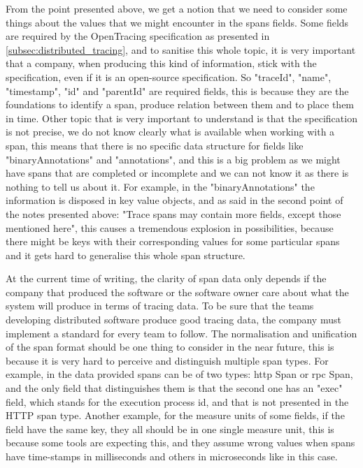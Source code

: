 From the point presented above, we get a notion that we need to consider some things about the values that we might encounter in the spans fields. Some fields are required by the OpenTracing specification as presented in \ref{subsec:distributed_tracing}, and to sanitise this whole topic, it is very important that a company, when producing this kind of information, stick with the specification, even if it is an open-source specification. So "traceId", "name", "timestamp", "id" and "parentId" are required fields, this is because they are the foundations to identify a span, produce relation between them and to place them in time. Other topic that is very important to understand is that the specification is not precise, we do not know clearly what is available when working with a span, this means that there is no specific data structure for fields like "binaryAnnotations" and "annotations", and this is a big problem as we might have spans that are completed or incomplete and we can not know it as there is nothing to tell us about it. For example, in the "binaryAnnotations" the information is disposed in key value objects, and as said in the second point of the notes presented above: "Trace spans may contain more fields, except those mentioned here", this causes a tremendous explosion in possibilities, because there might be keys with their corresponding values for some particular spans and it gets hard to generalise this whole span structure.

At the current time of writing, the clarity of span data only depends if the company that produced the software or the software owner care about what the system will produce in terms of tracing data. To be sure that the teams developing distributed software produce good tracing data, the company must implement a standard for every team to follow. The normalisation and unification of the span format should be one thing to consider in the near future, this is because it is very hard to perceive and distinguish multiple span types. For example, in the data provided spans can be of two types: \gls{http} Span or \gls{rpc} Span, and the only field that distinguishes them is that the second one has an "exec" field, which stands for the execution process id, and that is not presented in the HTTP span type. Another example, for the measure units of some fields, if the field have the same key, they all should be in one single measure unit, this is because some tools are expecting this, and they assume wrong values when spans have time-stamps in milliseconds and others in microseconds like in this case.


